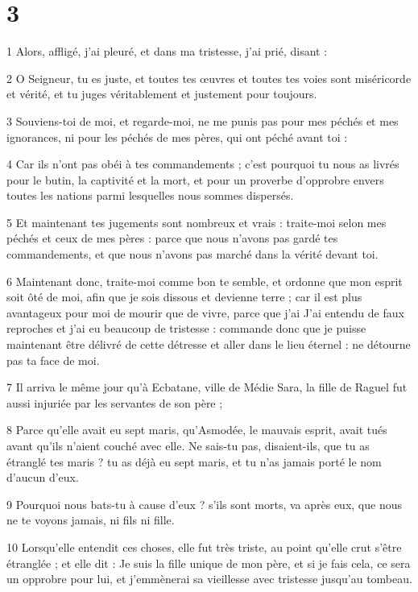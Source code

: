 \chapter{3}

\par 1 Alors, affligé, j'ai pleuré, et dans ma tristesse, j'ai prié, disant :
\par 2 O Seigneur, tu es juste, et toutes tes œuvres et toutes tes voies sont miséricorde et vérité, et tu juges véritablement et justement pour toujours.
\par 3 Souviens-toi de moi, et regarde-moi, ne me punis pas pour mes péchés et mes ignorances, ni pour les péchés de mes pères, qui ont péché avant toi :
\par 4 Car ils n'ont pas obéi à tes commandements ; c'est pourquoi tu nous as livrés pour le butin, la captivité et la mort, et pour un proverbe d'opprobre envers toutes les nations parmi lesquelles nous sommes dispersés.
\par 5 Et maintenant tes jugements sont nombreux et vrais : traite-moi selon mes péchés et ceux de mes pères : parce que nous n'avons pas gardé tes commandements, et que nous n'avons pas marché dans la vérité devant toi.
\par 6 Maintenant donc, traite-moi comme bon te semble, et ordonne que mon esprit soit ôté de moi, afin que je sois dissous et devienne terre ; car il est plus avantageux pour moi de mourir que de vivre, parce que j'ai J'ai entendu de faux reproches et j'ai eu beaucoup de tristesse : commande donc que je puisse maintenant être délivré de cette détresse et aller dans le lieu éternel : ne détourne pas ta face de moi.
\par 7 Il arriva le même jour qu'à Ecbatane, ville de Médie Sara, la fille de Raguel fut aussi injuriée par les servantes de son père ;
\par 8 Parce qu'elle avait eu sept maris, qu'Asmodée, le mauvais esprit, avait tués avant qu'ils n'aient couché avec elle. Ne sais-tu pas, disaient-ils, que tu as étranglé tes maris ? tu as déjà eu sept maris, et tu n'as jamais porté le nom d'aucun d'eux.
\par 9 Pourquoi nous bats-tu à cause d'eux ? s'ils sont morts, va après eux, que nous ne te voyons jamais, ni fils ni fille.
\par 10 Lorsqu'elle entendit ces choses, elle fut très triste, au point qu'elle crut s'être étranglée ; et elle dit : Je suis la fille unique de mon père, et si je fais cela, ce sera un opprobre pour lui, et j'emmènerai sa vieillesse avec tristesse jusqu'au tombeau.
